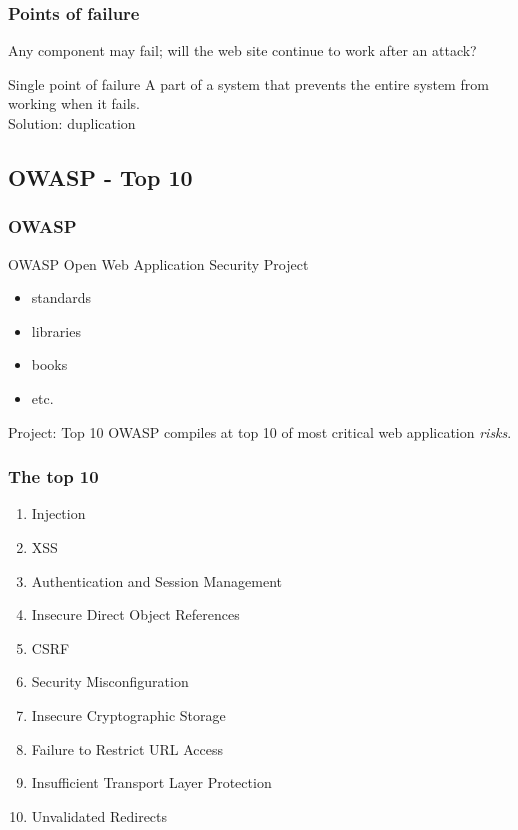 
\begin{frame}
\frametitle{Points of failure}
Any component may fail; will the web site continue to work after an attack?
\begin{block}{Single point of failure}
A part of a system that prevents the entire system from working when it fails.
\\ Solution: duplication
\end{block}
\end{frame}

\subsection{OWASP - Top 10}

\begin{frame}
\frametitle{OWASP}
\begin{block}{OWASP}
\centering Open Web Application Security Project
\begin{itemize}
\item standards
\item libraries
\item books
\item etc.
\end{itemize}
\end{block}
\begin{block}{Project: Top 10}
OWASP compiles at top 10 of most critical web application \emph{risks}.
\end{block}
\end{frame}

\begin{frame}
\frametitle{The top 10}
\begin{enumerate}
\item Injection
\item XSS
\item Authentication and Session Management
\item Insecure Direct Object References
\item CSRF
\item Security Misconfiguration
\item Insecure Cryptographic Storage
\item Failure to Restrict URL Access
\item Insufficient Transport Layer Protection
\item Unvalidated Redirects
\end{enumerate}
\end{frame}

